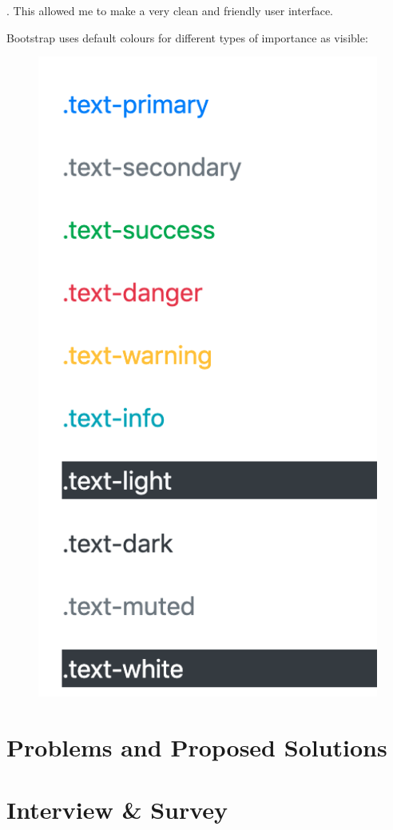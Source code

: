 \cite{wikipediacontributors_2019_bootstrap}. This allowed me to make a very clean and friendly user interface.

Bootstrap uses default colours for different types of importance as visible:

\begin{figure}[!h]
  \centering
	\includegraphics[scale=0.5]{Figures/bootstrap_colours}
\caption{}
\end{figure}

\section{Problems and Proposed Solutions}

\section{Interview \& Survey}
